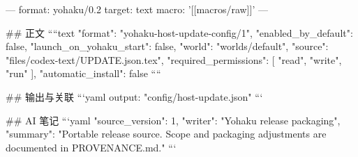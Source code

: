 ---
format: yohaku/0.2
target: text
macro: '[[macros/raw]]'
---

## 正文
````text
{
  "format": "yohaku-host-update-config/1",
  "enabled_by_default": false,
  "launch_on_yohaku_start": false,
  "world": "worlds/default",
  "source": "files/codex-text/UPDATE.json.tex",
  "required_permissions": [
    "read",
    "write",
    "run"
  ],
  "automatic_install": false
}
````

## 输出与关联
```yaml
output: "config/host-update.json"
```

## AI 笔记
```yaml
{"source_version": 1, "writer": "Yohaku release packaging", "summary": "Portable release source. Scope and packaging adjustments are documented in PROVENANCE.md."}
```
